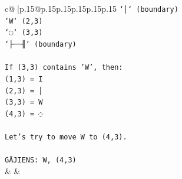 \documentclass{article}
\begin{document}
{\begin{supertabular}{c@{$\;$}|p{.15\linewidth}@{}p{.15\linewidth}p{.15\linewidth}p{.15\linewidth}p{.15\linewidth}p{.15\linewidth}}
{{{\texttt{`│` (boundary)} \\
\texttt{`W` (2,3)} \\
\texttt{`◌` (3,3)} \\
\texttt{`├──╢` (boundary)} \\
\\ 
\texttt{If (3,3) contains 'W', then:} \\
\texttt{(1,3) = I} \\
\texttt{(2,3) = │} \\
\texttt{(3,3) = W} \\
\texttt{(4,3) = ◌} \\
\\ 
\texttt{Let's try to move W to (4,3).} \\
\\ 
\texttt{GĀJIENS: W, (4,3)} \\
            }
        }
    }
    & & \\ \\


\end{supertabular}}
\end{document}
